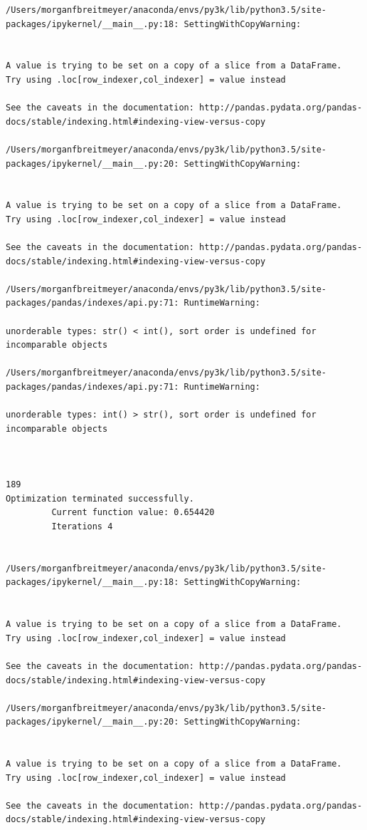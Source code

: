 \begin{lstlisting}
/Users/morganfbreitmeyer/anaconda/envs/py3k/lib/python3.5/site-packages/ipykernel/__main__.py:18: SettingWithCopyWarning:


A value is trying to be set on a copy of a slice from a DataFrame.
Try using .loc[row_indexer,col_indexer] = value instead

See the caveats in the documentation: http://pandas.pydata.org/pandas-docs/stable/indexing.html#indexing-view-versus-copy

/Users/morganfbreitmeyer/anaconda/envs/py3k/lib/python3.5/site-packages/ipykernel/__main__.py:20: SettingWithCopyWarning:


A value is trying to be set on a copy of a slice from a DataFrame.
Try using .loc[row_indexer,col_indexer] = value instead

See the caveats in the documentation: http://pandas.pydata.org/pandas-docs/stable/indexing.html#indexing-view-versus-copy

/Users/morganfbreitmeyer/anaconda/envs/py3k/lib/python3.5/site-packages/pandas/indexes/api.py:71: RuntimeWarning:

unorderable types: str() < int(), sort order is undefined for incomparable objects

/Users/morganfbreitmeyer/anaconda/envs/py3k/lib/python3.5/site-packages/pandas/indexes/api.py:71: RuntimeWarning:

unorderable types: int() > str(), sort order is undefined for incomparable objects



189
Optimization terminated successfully.
         Current function value: 0.654420
         Iterations 4


/Users/morganfbreitmeyer/anaconda/envs/py3k/lib/python3.5/site-packages/ipykernel/__main__.py:18: SettingWithCopyWarning:


A value is trying to be set on a copy of a slice from a DataFrame.
Try using .loc[row_indexer,col_indexer] = value instead

See the caveats in the documentation: http://pandas.pydata.org/pandas-docs/stable/indexing.html#indexing-view-versus-copy

/Users/morganfbreitmeyer/anaconda/envs/py3k/lib/python3.5/site-packages/ipykernel/__main__.py:20: SettingWithCopyWarning:


A value is trying to be set on a copy of a slice from a DataFrame.
Try using .loc[row_indexer,col_indexer] = value instead

See the caveats in the documentation: http://pandas.pydata.org/pandas-docs/stable/indexing.html#indexing-view-versus-copy


\end{lstlisting}
